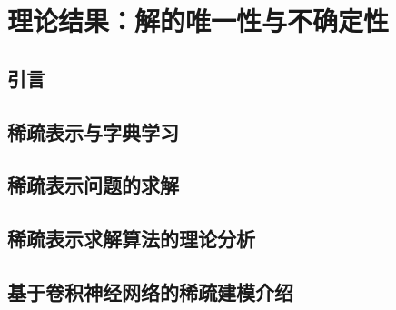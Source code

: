 \chapter{理论结果：解的唯一性与不确定性}\label{chap:srt02:theory}

\section{引言}

\section{稀疏表示与字典学习}

\section{稀疏表示问题的求解}

\section{稀疏表示求解算法的理论分析}



\section{基于卷积神经网络的稀疏建模介绍}

